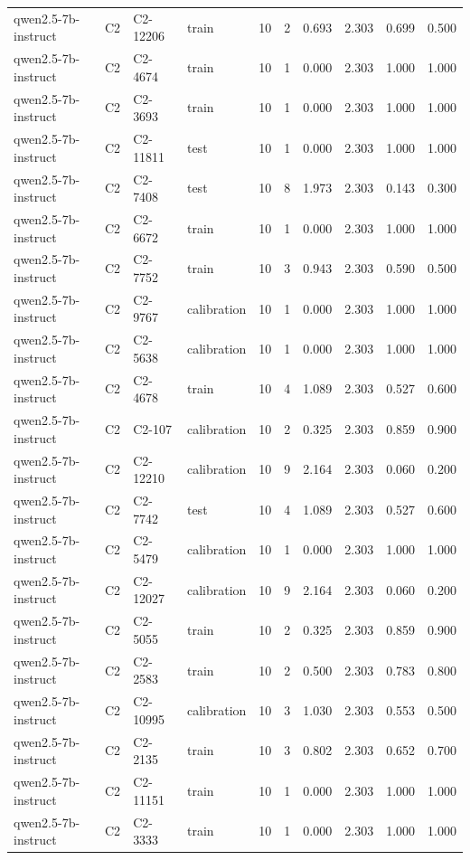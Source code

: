 \begin{table}
\begin{tabular}{llllrrrrrr}
qwen2.5-7b-instruct & C2 & C2-12206 & train & 10 & 2 & 0.693 & 2.303 & 0.699 & 0.500 \\
qwen2.5-7b-instruct & C2 & C2-4674 & train & 10 & 1 & 0.000 & 2.303 & 1.000 & 1.000 \\
qwen2.5-7b-instruct & C2 & C2-3693 & train & 10 & 1 & 0.000 & 2.303 & 1.000 & 1.000 \\
qwen2.5-7b-instruct & C2 & C2-11811 & test & 10 & 1 & 0.000 & 2.303 & 1.000 & 1.000 \\
qwen2.5-7b-instruct & C2 & C2-7408 & test & 10 & 8 & 1.973 & 2.303 & 0.143 & 0.300 \\
qwen2.5-7b-instruct & C2 & C2-6672 & train & 10 & 1 & 0.000 & 2.303 & 1.000 & 1.000 \\
qwen2.5-7b-instruct & C2 & C2-7752 & train & 10 & 3 & 0.943 & 2.303 & 0.590 & 0.500 \\
qwen2.5-7b-instruct & C2 & C2-9767 & calibration & 10 & 1 & 0.000 & 2.303 & 1.000 & 1.000 \\
qwen2.5-7b-instruct & C2 & C2-5638 & calibration & 10 & 1 & 0.000 & 2.303 & 1.000 & 1.000 \\
qwen2.5-7b-instruct & C2 & C2-4678 & train & 10 & 4 & 1.089 & 2.303 & 0.527 & 0.600 \\
qwen2.5-7b-instruct & C2 & C2-107 & calibration & 10 & 2 & 0.325 & 2.303 & 0.859 & 0.900 \\
qwen2.5-7b-instruct & C2 & C2-12210 & calibration & 10 & 9 & 2.164 & 2.303 & 0.060 & 0.200 \\
qwen2.5-7b-instruct & C2 & C2-7742 & test & 10 & 4 & 1.089 & 2.303 & 0.527 & 0.600 \\
qwen2.5-7b-instruct & C2 & C2-5479 & calibration & 10 & 1 & 0.000 & 2.303 & 1.000 & 1.000 \\
qwen2.5-7b-instruct & C2 & C2-12027 & calibration & 10 & 9 & 2.164 & 2.303 & 0.060 & 0.200 \\
qwen2.5-7b-instruct & C2 & C2-5055 & train & 10 & 2 & 0.325 & 2.303 & 0.859 & 0.900 \\
qwen2.5-7b-instruct & C2 & C2-2583 & train & 10 & 2 & 0.500 & 2.303 & 0.783 & 0.800 \\
qwen2.5-7b-instruct & C2 & C2-10995 & calibration & 10 & 3 & 1.030 & 2.303 & 0.553 & 0.500 \\
qwen2.5-7b-instruct & C2 & C2-2135 & train & 10 & 3 & 0.802 & 2.303 & 0.652 & 0.700 \\
qwen2.5-7b-instruct & C2 & C2-11151 & train & 10 & 1 & 0.000 & 2.303 & 1.000 & 1.000 \\
qwen2.5-7b-instruct & C2 & C2-3333 & train & 10 & 1 & 0.000 & 2.303 & 1.000 & 1.000 \\

\end{tabular}
\end{table}

